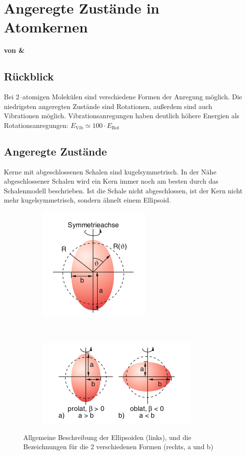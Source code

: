 \documentclass[Ex4_Zusammenfassung.tex]{subfiles}
\begin{document}
\section{Angeregte Zustände in Atomkernen}
\textbf{von \hein \& \martina}\\

\subsection*{Rückblick}
Bei 2--atomigen Molekülen sind verschiedene Formen der Anregung möglich. Die niedrigsten angeregten Zustände sind Rotationen, außerdem sind auch Vibrationen möglich. Vibrationsanregungen haben deutlich höhere Energien als Rotationsanregungen: $E_{\text{Vib}}  \simeq 100\cdot E_{\text{Rot}}$

\subsection{Angeregte Zustände}
Kerne mit abgeschlossenen Schalen sind kugelsymmetrisch. In der Nähe abgeschlossener Schalen wird ein Kern immer noch am besten durch das Schalenmodell beschrieben. Ist die Schale nicht abgeschlossen, ist der Kern nicht mehr kugelsymmetrisch, sondern ähnelt einem Ellipsoid. 
\begin{figure}[h]
	\begin{subfigure}[t]{0.3\textwidth}
		\centering
		\includegraphics[scale=0.55, trim= 0 -0.45cm 0 0]{ellipsoid_1.png}
	\end{subfigure}
	~
	\begin{subfigure}[b]{0.7\textwidth}
		\centering
		\includegraphics[scale=0.6]{ellipsoid_2.png}
	\end{subfigure}
	\caption{Allgemeine Beschreibung der Ellipsoiden (links), und die Bezeichnungen für die 2 verschiedenen Formen (rechts, a und b)}
	\label{ellipsoids}
\end{figure}
\end{document}
